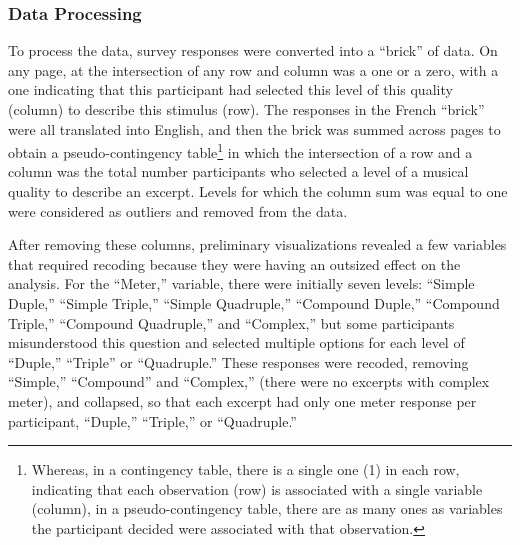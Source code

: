 \documentclass[
  english,
  man,floatsintext]{apa6}
\begin{document}
\hypertarget{data-processing}{%
\subsubsection{Data Processing}\label{data-processing}}

To process the data, survey responses were converted into a ``brick'' of data. On any page, at the intersection of any row and column was a one or a zero, with a one indicating that this participant had selected this level of this quality (column) to describe this stimulus (row). The responses in the French ``brick'' were all translated into English, and then the brick was summed across pages to obtain a pseudo-contingency table\footnote{Whereas, in a contingency table, there is a single one (1) in each row, indicating that each observation (row) is associated with a single variable (column), in a pseudo-contingency table, there are as many ones as variables the participant decided were associated with that observation.} in which the intersection of a row and a column was the total number participants who selected a level of a musical quality to describe an excerpt. Levels for which the column sum was equal to one were considered as outliers and removed from the data.

After removing these columns, preliminary visualizations revealed a few variables that required recoding because they were having an outsized effect on the analysis. For the ``Meter,'' variable, there were initially seven levels: ``Simple Duple,'' ``Simple Triple,'' ``Simple Quadruple,'' ``Compound Duple,'' ``Compound Triple,'' ``Compound Quadruple,'' and ``Complex,'' but some participants misunderstood this question and selected multiple options for each level of ``Duple,'' ``Triple'' or ``Quadruple.'' These responses were recoded, removing ``Simple,'' ``Compound'' and ``Complex,'' (there were no excerpts with complex meter), and collapsed, so that each excerpt had only one meter response per participant, ``Duple,'' ``Triple,'' or ``Quadruple.''
\end{document}
